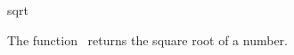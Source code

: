 \begin{ccRefFunction}{sqrt}

\ccDefinition

The function \ccRefName\ returns the square root of a number.


{}

\end{ccRefFunction}
